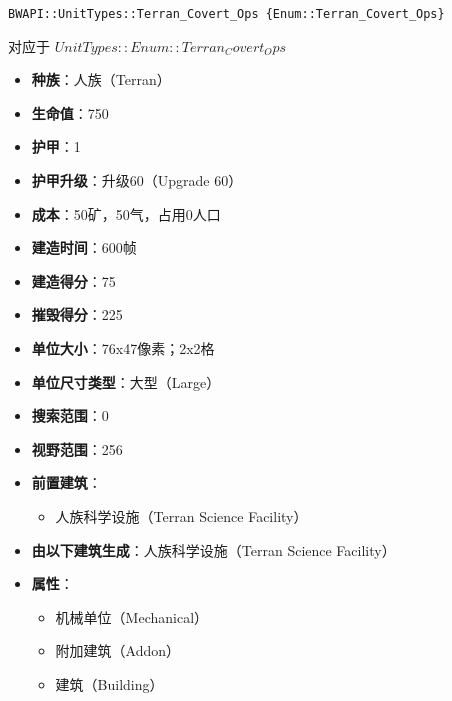 \begin{tcolorbox}[colback=white, colframe=black!60!white, title=Terran\_Covert\_Ops(), arc=0mm]
    \begin{verbatim}
BWAPI::UnitTypes::Terran_Covert_Ops {Enum::Terran_Covert_Ops}
    \end{verbatim}
    对应于  $ UnitTypes::Enum::Terran_Covert_Ops $ 
    \begin{itemize}
        \item \textbf{种族}：人族（Terran）
        \item \textbf{生命值}：750
        \item \textbf{护甲}：1
        \item \textbf{护甲升级}：升级60（Upgrade 60）
        \item \textbf{成本}：50矿，50气，占用0人口
        \item \textbf{建造时间}：600帧
        \item \textbf{建造得分}：75
        \item \textbf{摧毁得分}：225
        \item \textbf{单位大小}：76x47像素；2x2格
        \item \textbf{单位尺寸类型}：大型（Large）
        \item \textbf{搜索范围}：0
        \item \textbf{视野范围}：256
        \item \textbf{前置建筑}：
            \begin{itemize}
                \item 人族科学设施（Terran Science Facility）
            \end{itemize}
        \item \textbf{由以下建筑生成}：人族科学设施（Terran Science Facility）
        \item \textbf{属性}：
            \begin{itemize}
                \item 机械单位（Mechanical）
                \item 附加建筑（Addon）
                \item 建筑（Building）
            \end{itemize}
    \end{itemize} 
\end{tcolorbox}


